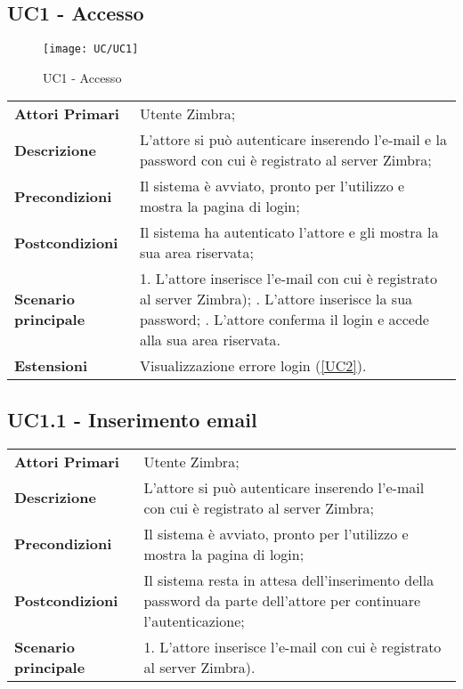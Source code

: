 \subsection{UC1 - Accesso}
	\begin{figure}[H] 
		\centering
		\texttt{[image: UC/UC1]}
		\caption{UC1 - Accesso}
	\end{figure}
	\begin{center}
	\bgroup
	\def\arraystretch{1.8}     
	\begin{longtable}{  p{4cm} | p{9.5cm} } 
		\textbf{Attori Primari} & Utente Zimbra; \\ 
		\textbf{Descrizione} & L’attore si può autenticare inserendo l'e-mail e la password con cui è registrato al server Zimbra; \\ 
		\textbf{Precondizioni}  & Il sistema è avviato, pronto per l’utilizzo e mostra la pagina di login; \\
		\textbf{Postcondizioni} & Il sistema ha autenticato l’attore e gli mostra la sua area riservata;  \\ 
		\textbf{Scenario principale} & 
			1. L’attore inserisce l'e-mail con cui è registrato al server Zimbra); \newline
			2. L’attore inserisce la sua password; \newline
			3. L’attore conferma il login e accede alla sua area riservata.\\
		\textbf{Estensioni} & Visualizzazione errore login (\ref{UC2}).
	\end{longtable}
	\egroup
\end{center}

\subsection{UC1.1 - Inserimento email}
	\begin{center}
	\bgroup
	\def\arraystretch{1.8}     
	\begin{longtable}{  p{4cm} | p{9.5cm} } 
		\textbf{Attori Primari} & Utente Zimbra; \\ 
		\textbf{Descrizione} & L’attore si può autenticare inserendo l'e-mail con cui è registrato al server Zimbra; \\ 
		\textbf{Precondizioni}  & Il sistema è avviato, pronto per l’utilizzo e mostra la pagina di login; \\
		\textbf{Postcondizioni} & Il sistema resta in attesa dell'inserimento della password da parte dell'attore per continuare l'autenticazione;  \\ 
		\textbf{Scenario principale} & 
		1. L’attore inserisce l'e-mail con cui è registrato al server Zimbra).
	\end{longtable}
	\egroup
\end{center}
